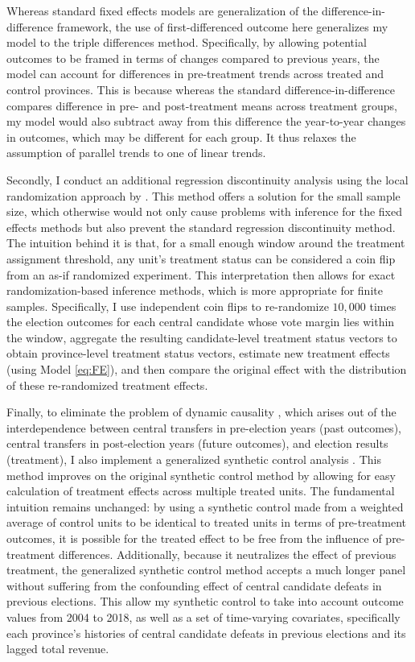 \documentclass[12pt]{article}
\newcommand{\1}{\mathbbm{1}}
\begin{document}
Whereas standard fixed effects models are generalization of the difference-in-difference framework, the use of first-differenced outcome here generalizes my model to the triple differences method. Specifically, by allowing potential outcomes to be framed in terms of changes compared to previous years, the model can account for differences in pre-treatment trends across treated and control provinces. This is because whereas the standard difference-in-difference compares difference in pre- and post-treatment means across treatment groups, my model would also subtract away from this difference the year-to-year changes in outcomes, which may be different for each group. It thus relaxes the assumption of parallel trends to one of linear trends.

Secondly, I conduct an additional regression discontinuity analysis using the local randomization approach by \citet{CattaneoTitiunik2015}. This method offers a solution for the small sample size, which otherwise would not only cause problems with inference for the fixed effects methods but also prevent the standard regression discontinuity method. The intuition behind it is that, for a small enough window around the treatment assignment threshold, any unit's treatment status can be considered a coin flip from an as-if randomized experiment. This interpretation then allows for exact randomization-based inference methods, which is more appropriate for finite samples. Specifically, I use independent coin flips to re-randomize $10,000$ times the election outcomes for each central candidate whose vote margin lies within the window, aggregate the resulting candidate-level treatment status vectors to obtain province-level treatment status vectors, estimate new treatment effects (using Model \ref{eq:FE}), and then compare the original effect with the distribution of these re-randomized treatment effects.

Finally, to eliminate the problem of dynamic causality \citep{ImaiKim2019}, which arises out of the interdependence between central transfers in pre-election years (past outcomes), central transfers in post-election years (future outcomes), and election results (treatment), I also implement a generalized synthetic control analysis \citep{Xu2017gsynth}. This method improves on the original synthetic control method \citep{Abadie2010} by allowing for easy calculation of treatment effects across multiple treated units. The fundamental intuition remains unchanged: by using a synthetic control made from a weighted average of control units to be identical to treated units in terms of pre-treatment outcomes, it is possible for the treated effect to be free from the influence of pre-treatment differences. Additionally, because it neutralizes the effect of previous treatment, the generalized synthetic control method accepts a much longer panel without suffering from the confounding effect of central candidate defeats in previous elections. This allow my synthetic control to take into account outcome values from 2004 to 2018, as well as a set of time-varying covariates, specifically each province's histories of central candidate defeats in previous elections and its lagged total revenue.
\end{document}
